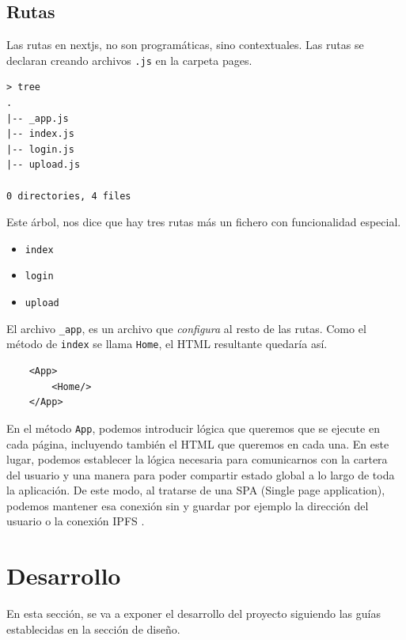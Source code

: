 \subsection{Rutas}
Las rutas en nextjs, no son programáticas, sino contextuales. Las rutas se declaran creando archivos \verb|.js| en la carpeta pages.
\begin{lstlisting}
> tree
.
|-- _app.js
|-- index.js
|-- login.js
|-- upload.js

0 directories, 4 files
\end{lstlisting}
Este árbol, nos dice que hay tres rutas más un fichero con funcionalidad especial.
\begin{itemize}
    \item \verb|index|
    \item \verb|login|
    \item \verb|upload|
\end{itemize}
El archivo \verb|_app|, es un archivo que \textit{configura} al resto de las rutas.
Como el método de \verb|index| se llama \verb|Home|, el HTML resultante quedaría así.
\begin{lstlisting}
    <App>
        <Home/>
    </App>
\end{lstlisting}
En el método \verb|App|, podemos introducir lógica que queremos que se ejecute en cada página, incluyendo también el HTML que queremos en cada una. En este lugar, podemos establecer la lógica necesaria para comunicarnos con la cartera del usuario y una manera para poder compartir estado global a lo largo de toda la aplicación.
De este modo, al tratarse de una SPA \cite{web:spa} (Single page application), podemos mantener esa conexión sin y guardar por ejemplo la dirección del usuario o la conexión IPFS \cite{web:ipfs}.
\section{Desarrollo}
En esta sección, se va a exponer el desarrollo del proyecto siguiendo las guías establecidas en la sección de diseño.
